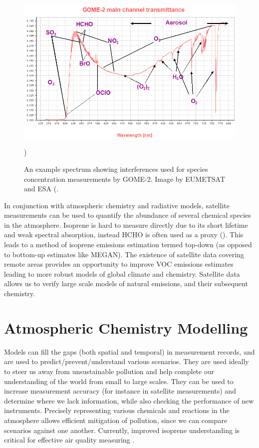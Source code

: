     \begin{figure}
      \includegraphics[width=\textwidth]{Figures/GOME_SPECTRUM.jpg}
      \caption{An example spectrum showing interferences used for species concentration measurements by GOME-2. Image by EUMETSAT and ESA (\cite{GOME2Image}.})
      \label{LR:HCHO:Sat:fig_GOME_products}
    \end{figure}
    
    In conjunction with atmospheric chemistry and radiative models, satellite measurements can be used to quantify the abundance of several chemical species in the atmosphere.
    Isoprene is hard to measure directly due to its short lifetime and weak spectral absorption, instead HCHO is often used as a proxy (\cite{Millet2006, Fu2007, Dufour2009, Marais2012, bauwens2013satellite, Kefauver2014, Bauwens2016}).
    This leads to a method of isoprene emissions estimation termed top-down (as opposed to bottom-up estimates like MEGAN).
    The existence of satellite data covering remote areas provides an opportunity to improve VOC emissions estimates leading to more robust models of global climate and chemistry. 
    Satellite data allows us to verify large scale models of natural emissions, and their subsequent chemistry.
  

  
\section{Atmospheric Chemistry Modelling}
\label{LR:Models}
  
  Models can fill the gaps (both spatial and temporal) in measurement records, and are used to predict/prevent/understand various scenarios.
  They are used ideally to steer us away from unsustainable pollution and help complete our understanding of the world from small to large scales.
  They can be used to increase measurement accuracy (for instance in satellite measurements) and determine where we lack information, while also checking the performance of new instruments.
  Precisely representing various chemicals and reactions in the atmosphere allows efficient mitigation of pollution, since we can compare scenarios against one another.
  Currently, improved isoprene understanding is critical for effective air quality measuring \citep{Marvin2017}.
  
